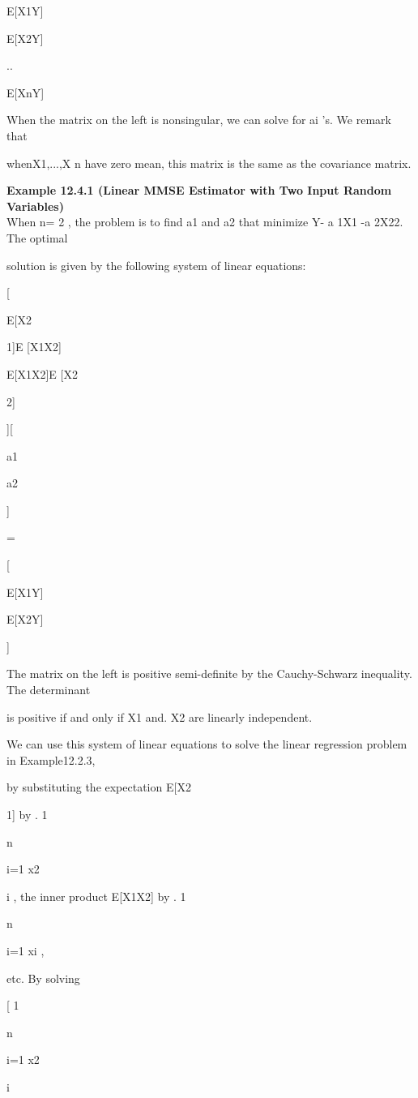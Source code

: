 E[X1Y]

E[X2Y]

..

E[XnY]

When the matrix on the left is nonsingular, we can solve for ai 's. We remark that

whenX1,...,X n have zero mean, this matrix is the same as the covariance matrix.

\textbf{Example 12.4.1 (Linear MMSE Estimator with Two Input Random Variables)} \\

When n= 2 , the problem is to find a1 and a2 that minimize Y- a 1X1 -a 2X22. The optimal

solution is given by the following system of linear equations:

[

E[X2

1]E [X1X2]

E[X1X2]E [X2

2]

][

a1

a2

]

=

[

E[X1Y]

E[X2Y]

]

The matrix on the left is positive semi-definite by the Cauchy-Schwarz inequality. The determinant

is positive if and only if X1 and. X2 are linearly independent.

We can use this system of linear equations to solve the linear regression problem in Example12.2.3,

by substituting the expectation E[X2

1] by . 1

n

\sumn

i=1 x2

i , the inner product E[X1X2] by . 1

n

\sumn

i=1 xi ,

etc. By solving

[ 1

n

\sumn

i=1 x2

i

